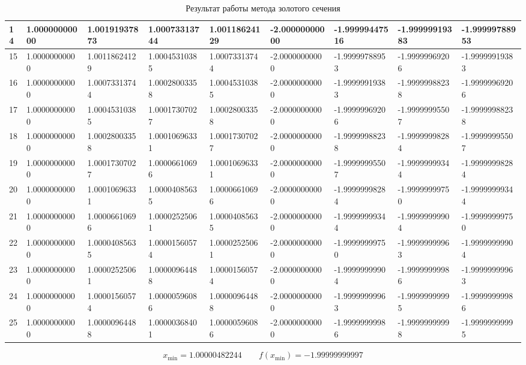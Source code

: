 \begin{table}[H]
{\begin{tabular}{|l|l|l|l|l|l|l|l|l|}
    \hline
14 & 1.00000000000 & 1.00191937873 & 1.00073313744 & 1.00118624129 & -2.00000000000 & -1.99999447516 & -1.99999919383 & -1.99999788953 \\
    \hline
15 & 1.00000000000 & 1.00118624129 & 1.00045310385 & 1.00073313744 & -2.00000000000 & -1.99999788953 & -1.99999969206 & -1.99999919383 \\
    \hline
16 & 1.00000000000 & 1.00073313744 & 1.00028003358 & 1.00045310385 & -2.00000000000 & -1.99999919383 & -1.99999988238 & -1.99999969206 \\
    \hline
17 & 1.00000000000 & 1.00045310385 & 1.00017307027 & 1.00028003358 & -2.00000000000 & -1.99999969206 & -1.99999995507 & -1.99999988238 \\
    \hline
18 & 1.00000000000 & 1.00028003358 & 1.00010696331 & 1.00017307027 & -2.00000000000 & -1.99999988238 & -1.99999998284 & -1.99999995507 \\
    \hline
19 & 1.00000000000 & 1.00017307027 & 1.00006610696 & 1.00010696331 & -2.00000000000 & -1.99999995507 & -1.99999999344 & -1.99999998284 \\
    \hline
20 & 1.00000000000 & 1.00010696331 & 1.00004085635 & 1.00006610696 & -2.00000000000 & -1.99999998284 & -1.99999999750 & -1.99999999344 \\
    \hline
21 & 1.00000000000 & 1.00006610696 & 1.00002525061 & 1.00004085635 & -2.00000000000 & -1.99999999344 & -1.99999999904 & -1.99999999750 \\
    \hline
22 & 1.00000000000 & 1.00004085635 & 1.00001560574 & 1.00002525061 & -2.00000000000 & -1.99999999750 & -1.99999999963 & -1.99999999904 \\
    \hline
23 & 1.00000000000 & 1.00002525061 & 1.00000964488 & 1.00001560574 & -2.00000000000 & -1.99999999904 & -1.99999999986 & -1.99999999963 \\
    \hline
24 & 1.00000000000 & 1.00001560574 & 1.00000596086 & 1.00000964488 & -2.00000000000 & -1.99999999963 & -1.99999999995 & -1.99999999986 \\
    \hline
25 & 1.00000000000 & 1.00000964488 & 1.00000368401 & 1.00000596086 & -2.00000000000 & -1.99999999986 & -1.99999999998 & -1.99999999995 \\
    \hline
  \end{tabular}}
  \caption{Результат работы метода золотого сечения}
\end{table}
\[
  x_\min = 1.00000482244
  \qquad
  f(x_{\min}) = -1.99999999997
\]


